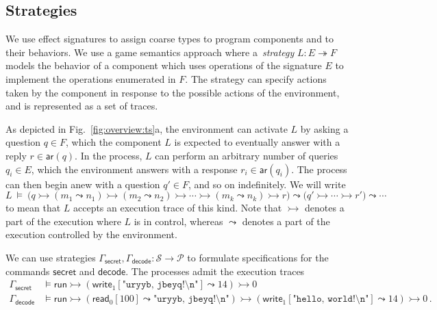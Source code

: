 \documentclass[acmsmall,nonacm]{acmart}
\newcommand{\kw}[1]{\ensuremath{ \mathsf{#1} }}
\begin{document}
\subsection{Strategies} \label{sec:strat} %

We use effect signatures to assign coarse types
to program components and to their behaviors.
We use a game semantics approach where
a~\emph{strategy} $L : E \twoheadrightarrow F$
models the behavior of a component which
uses operations of the signature $E$ to
implement the operations enumerated in $F$.
The strategy can specify actions taken by the component
in response to the possible actions of the environment,
and is represented as a set of traces.

As depicted in Fig.~\ref{fig:overview:ts}a,
the environment can activate $L$ by asking a question $q \in F$,
which the component $L$ is expected to eventually answer
with a reply $r \in \kw{ar}(q)$.
In the process,
$L$ can perform an arbitrary number of queries $q_i \in E$,
which the environment answers with a response $r_i \in \kw{ar}(q_i)$.
The process can then begin anew with a question $q' \in F$,
and so on indefinitely.
We will write
\[
  L \:\vDash\: \big(q
    \rightarrowtail (m_1 \leadsto n_1)
    \rightarrowtail (m_2 \leadsto n_2)
    \rightarrowtail \cdots
    \rightarrowtail (m_k \leadsto n_k)
    \rightarrowtail r \big)
  \leadsto \big(q'
    \rightarrowtail \cdots
    \rightarrowtail r' \big)
  \leadsto \cdots
\]
to mean that $L$ accepts an execution trace of this kind.
Note that $\rightarrowtail$ denotes a part of the execution
where $L$ is in control,
whereas $\leadsto$ denotes a part of the execution
controlled by the environment.

\begin{example} \label{ex:decodespec} %
We can use strategies $\Gamma_\kw{secret}, \Gamma_\kw{decode} : \mathcal{S} \rightarrow \mathcal{P}$
to formulate specifications for the commands $\kw{secret}$ and $\kw{decode}$.
The processes admit the execution traces
{\small\begin{align*}
  \Gamma_\kw{secret} &\vDash \kw{run}
    \rightarrowtail (\kw{write}_1[\texttt{"uryyb, jbeyq!\textbackslash{}n"}] \leadsto 14)
    \rightarrowtail 0
  \\
  \Gamma_\kw{decode} &\vDash \kw{run}
    \rightarrowtail (\kw{read}_0[100] \leadsto \texttt{"uryyb, jbeyq!\textbackslash{}n"})
    \rightarrowtail (\kw{write}_1[\texttt{"hello, world!\textbackslash{}n"}] \leadsto 14)
    \rightarrowtail 0
  \,.
\end{align*}}
\end{example}
\end{document}

